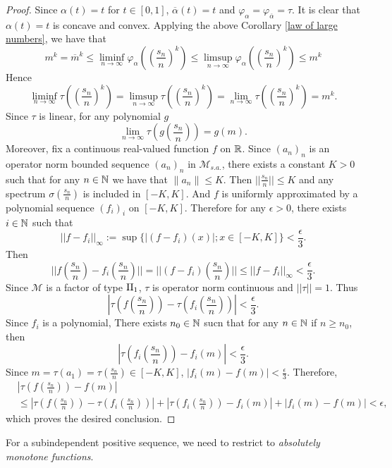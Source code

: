 \documentclass[a4paper,12pt]{amsart}
\newcommand{\M}{\mathcal{M}}
\begin{document}
\begin{proof}
Since $\alpha(t) = t$ for $t \in [0,1]$, ${\overline{\alpha}}(t) = t$ and  
$\varphi_{\alpha} = \varphi_{\overline{\alpha}} = \tau$. It is clear that $\alpha(t) = t$ is concave and convex.   
Applying the above Corollary \ref{law of large numbers}, we have that 
$$
m^k = \overline{m} ^k \leq \liminf _{n \rightarrow \infty}  \varphi_{\alpha}((\frac{s_n}{n})^k) 
\leq \limsup _{n \rightarrow \infty}  \varphi_{\alpha}((\frac{s_n}{n})^k) \leq m^k
$$
Hence 
$$
\liminf _{n \rightarrow \infty}  \tau((\frac{s_n}{n})^k )= \limsup _{n \rightarrow \infty} \tau((\frac{s_n}{n})^k) = \lim_{n \rightarrow \infty}  \tau((\frac{s_n}{n})^k) =  m^k. 
$$
Since $\tau$ is linear, for any polynomial $g$ 
$$
\lim_{n \rightarrow \infty}  \tau(g(\frac{s_n}{n})) =  g(m). 
$$
Moreover, fix a continuous real-valued function $f$ on ${\Bbb R}$.  
Since $(a_n)_n$ is an operator norm bounded sequence $(a_n)_n$ in ${\M}_{s.a.}$, there exists a constant 
$K > 0$ such that for any $n \in {\Bbb N}$ we have that $\|a_n\| \leq K$.  Then $||\frac{s_n}{n}|| \leq K$  and 
any spectrum $\sigma (\frac{s_n}{n})$ is included in $[-K,K]$. And $f$ is uniformly approximated by a polynomial sequence 
$(f_i)_i$ on $[-K,K]$.  Therefore for any $\epsilon > 0$, there exists $i \in {\Bbb N}$ such that
$$
||f -f_i||_{\infty} :=\sup \{|(f - f_i)(x)| ; x \in [-K,K]\} < \frac{\epsilon}{3}.
$$
Then
$$
||f(\frac{s_n}{n}) -f_i(\frac{s_n}{n})|| =||(f-f_i)  (\frac{s_n}{n})|| \leq ||f -f_i||_{\infty}< \frac{\epsilon}{3}.
$$
Since $\M$ is a factor of type ${\rm II}_1$, $\tau$ is operator norm continuous and $||\tau|| =1$. 
Thus 
$$
|\tau(f(\frac{s_n}{n})) - \tau(f_i(\frac{s_n}{n}))| < \frac{\epsilon}{3}.
$$
Since $f_i$ is a polynomial, There exists $n_0 \in {\Bbb N}$ sucn that for any $n \in {\Bbb N}$ if $n \geq n_0$, 
then
$$
|\tau(f_i(\frac{s_n}{n})) - f_i(m)| < \frac{\epsilon}{3}. 
$$
Since $m = \tau(a_1) = \tau(\frac{s_n}{n}) \in [-K,K]$, $|f_i(m) -f(m)| < \frac{\epsilon}{3}.$ 
Therefore, 
\begin{align*}
&  |\tau(f(\frac{s_n}{n})) - f(m)| \\
&\leq |\tau(f(\frac{s_n}{n})) - \tau(f_i(\frac{s_n}{n}))| + 
|\tau(f_i(\frac{s_n}{n})) - f_i(m)| + |f_i(m) -f(m)| < \epsilon, 
\end{align*}     
which proves the desired conclusion.
\end{proof}

For a subindependent positive sequence, we need to restrict to {\it absolutely monotone functions}.  
\end{document}
